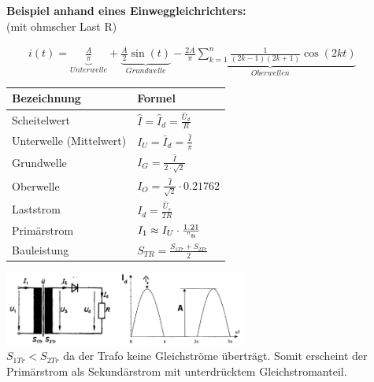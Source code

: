 	\begin{minipage}[c]{8cm} 
	   \textbf{Beispiel anhand eines Einweggleichrichters:}	  	\\
	   (mit ohmscher Last R) 
	\end{minipage}   
	\begin{minipage}[c]{10cm} 	
	   $ \qquad i(t) = \underbrace{\frac{A}{\pi}}_{Unterwelle} + \underbrace{\frac{A}{2}
	   \sin(t)}_{Grundwelle} - \underbrace{\frac{2A}{\pi} \sum\limits_{k=1}^n \frac{1}{(2k-1)(2k+1)} \cos(2kt)}_{Oberwellen} $
	\end{minipage}   
		
	\begin{minipage}[c]{10cm}  
		\begin{tabular}{| l | l |}
    		\hline 
      		\textbf{Bezeichnung}
      		& \textbf{Formel} \\
      		\hline
      		Scheitelwert 
      		& $\hat{I} = \hat{I}_d = \frac{\hat{U}_d}{R} $ \\
      		Unterwelle (Mittelwert)
      		& $I_U = \bar{I}_d = \frac{\hat{I}}{\pi}$ \\
      		Grundwelle
      		& $I_G = \frac{\hat{I}}{2 \cdot \sqrt{2}}$ \\
      		Oberwelle
      		& $I_O = \frac{\hat{I}}{\sqrt{2}} \cdot 0.21762$ \\
      		Laststrom
      		& $I_{d} =\frac{\hat{U}_s}{2 R}$ \\
      		Prim\"arstrom
      		& $I_1 \approx I_U \cdot \frac{1.21}{"u}$ \\
      		Bauleistung 
      		& $S_{TR} = \frac{S_{1Tr} + S_{2Tr}}{2}$ \\
      		\hline 
    	\end{tabular}
	\end{minipage}   
	\begin{minipage}[c]{8cm}  
			\includegraphics[width=8cm]{bilder/EinwegGR.png}  \\			
	$S_{1Tr} < S_{2Tr}$ da der Trafo keine Gleichstr\"ome übertr\"agt. Somit erscheint der Prim\"arstrom
	als Sekund\"arstrom mit unterdrücktem Gleichstromanteil.			
	\end{minipage}

